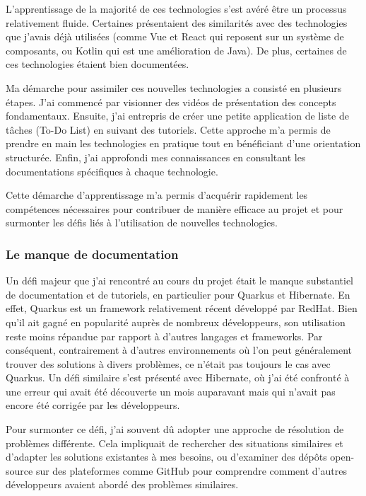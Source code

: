 L'apprentissage de la majorité de ces technologies s'est avéré être un processus relativement fluide. Certaines présentaient des similarités avec des technologies que j'avais déjà utilisées (comme Vue et React qui reposent sur un système de composants, ou Kotlin qui est une amélioration de Java). De plus, certaines de ces technologies étaient bien documentées.

Ma démarche pour assimiler ces nouvelles technologies a consisté en plusieurs étapes. J'ai commencé par visionner des vidéos de présentation des concepts fondamentaux. Ensuite, j'ai entrepris de créer une petite application de liste de tâches (To-Do List) en suivant des tutoriels. Cette approche m'a permis de prendre en main les technologies en pratique tout en bénéficiant d'une orientation structurée. Enfin, j'ai approfondi mes connaissances en consultant les documentations spécifiques à chaque technologie.

Cette démarche d'apprentissage m'a permis d'acquérir rapidement les compétences nécessaires pour contribuer de manière efficace au projet et pour surmonter les défis liés à l'utilisation de nouvelles technologies.

\subsubsection{Le manque de documentation}

Un défi majeur que j'ai rencontré au cours du projet était le manque substantiel de documentation et de tutoriels, en particulier pour Quarkus et Hibernate. En effet, Quarkus est un framework relativement récent développé par RedHat. Bien qu'il ait gagné en popularité auprès de nombreux développeurs, son utilisation reste moins répandue par rapport à d'autres langages et frameworks. Par conséquent, contrairement à d'autres environnements où l'on peut généralement trouver des solutions à divers problèmes, ce n'était pas toujours le cas avec Quarkus. Un défi similaire s'est présenté avec Hibernate, où j'ai été confronté à une erreur qui avait été découverte un mois auparavant mais qui n'avait pas encore été corrigée par les développeurs.

Pour surmonter ce défi, j'ai souvent dû adopter une approche de résolution de problèmes différente. Cela impliquait de rechercher des situations similaires et d'adapter les solutions existantes à mes besoins, ou d'examiner des dépôts open-source sur des plateformes comme GitHub pour comprendre comment d'autres développeurs avaient abordé des problèmes similaires.


